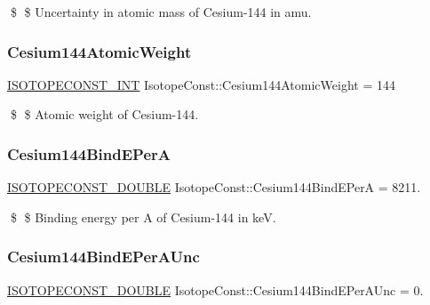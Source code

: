 \$ \$ Uncertainty in atomic mass of Cesium-\/144 in amu. \mbox{\label{group___isotope_const-_cesium-_cs144_ga5e0608e05f7b862730a642dd029121a8}} 
\subsubsection{\texorpdfstring{Cesium144\+Atomic\+Weight}{Cesium144AtomicWeight}}
{\footnotesize\ttfamily \mbox{\hyperlink{group___isotope_const-_macros_ga5f18360b3e99483a35c32d789e62621c}{I\+S\+O\+T\+O\+P\+E\+C\+O\+N\+S\+T\+\_\+\+I\+NT}} Isotope\+Const\+::\+Cesium144\+Atomic\+Weight = 144}

\$ \$ Atomic weight of Cesium-\/144. \mbox{\label{group___isotope_const-_cesium-_cs144_ga3b58af19813b494c3373c0fc5c058797}} 
\subsubsection{\texorpdfstring{Cesium144\+Bind\+E\+PerA}{Cesium144BindEPerA}}
{\footnotesize\ttfamily \mbox{\hyperlink{group___isotope_const-_macros_ga8f45a7272ce02c0b4c65c44636ed719a}{I\+S\+O\+T\+O\+P\+E\+C\+O\+N\+S\+T\+\_\+\+D\+O\+U\+B\+LE}} Isotope\+Const\+::\+Cesium144\+Bind\+E\+PerA = 8211.}

\$ \$ Binding energy per A of Cesium-\/144 in keV. \mbox{\label{group___isotope_const-_cesium-_cs144_ga05c519b013721a9d72809e5ed6415448}} 
\subsubsection{\texorpdfstring{Cesium144\+Bind\+E\+Per\+A\+Unc}{Cesium144BindEPerAUnc}}
{\footnotesize\ttfamily \mbox{\hyperlink{group___isotope_const-_macros_ga8f45a7272ce02c0b4c65c44636ed719a}{I\+S\+O\+T\+O\+P\+E\+C\+O\+N\+S\+T\+\_\+\+D\+O\+U\+B\+LE}} Isotope\+Const\+::\+Cesium144\+Bind\+E\+Per\+A\+Unc = 0.}

